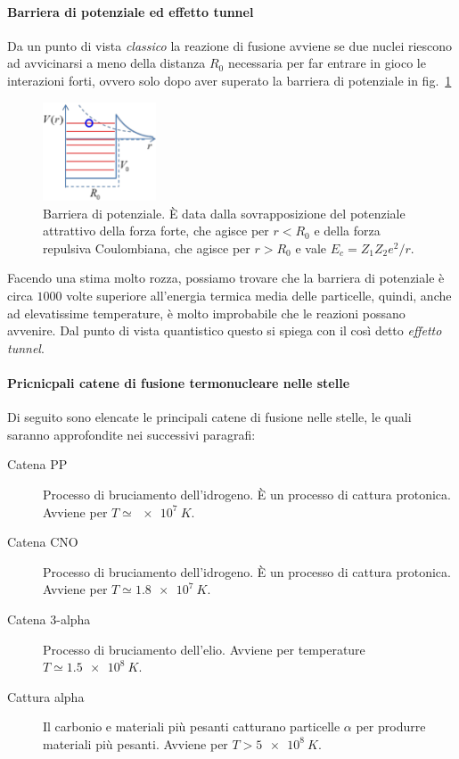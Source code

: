 \paragraph{Barriera di potenziale ed effetto tunnel}
Da un punto di vista \emph{classico} la reazione di fusione avviene se due nuclei riescono ad avvicinarsi a meno della distanza $R_0$ necessaria per far entrare in gioco le interazioni forti, ovvero solo dopo aver superato la barriera di potenziale in fig.~\ref{fig:barriera-potenziale}

\begin{figure}
    \centering
    \includegraphics[width=0.3\textwidth]{immagini/barriera-potenziale.png}
    \caption{Barriera di potenziale. È data dalla sovrapposizione del potenziale attrattivo della forza forte, che agisce per $r < R_0$ e della forza repulsiva Coulombiana, che agisce per $r > R_0$ e vale $E_c = Z_1 Z_2 e^2 / r$.}
    \label{fig:barriera-potenziale}
\end{figure}

Facendo una stima molto rozza, possiamo trovare che la barriera di potenziale è circa $1000$ volte superiore all'energia termica media delle particelle, quindi, anche ad elevatissime temperature, è molto improbabile che le reazioni possano avvenire. Dal punto di vista quantistico questo si spiega con il così detto \emph{effetto tunnel}.

\paragraph{Pricnicpali catene di fusione termonucleare nelle stelle}
Di seguito sono elencate le principali catene di fusione nelle stelle, le quali saranno approfondite nei successivi paragrafi:
\begin{description}
    \item[Catena PP] Processo di bruciamento dell'idrogeno. È un processo di cattura protonica. Avviene per $T \simeq \SI{e7}{K}$.
    \item[Catena CNO] Processo di bruciamento dell'idrogeno. È un processo di cattura protonica. Avviene per $T \simeq \SI{1.8e7}{K}$.
    \item[Catena 3-alpha] Processo di bruciamento dell'elio. Avviene per temperature $T \simeq \SI{1.5e8}{K}$.
    \item[Cattura alpha] Il carbonio e materiali più pesanti catturano particelle $\alpha$ per produrre materiali più pesanti. Avviene per $T > \SI{5e8}{K}$.
\end{description}

